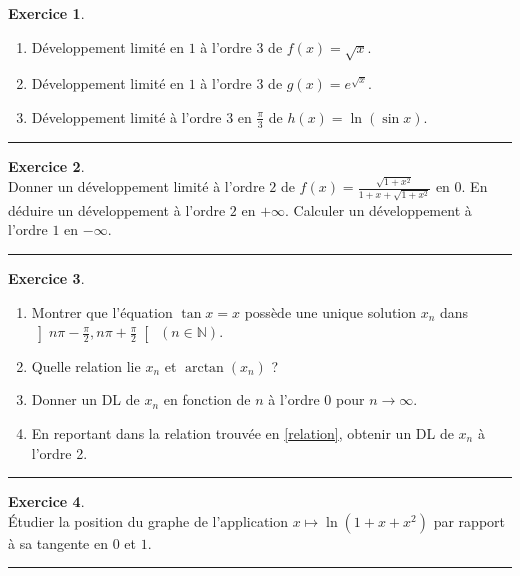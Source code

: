 \documentclass[a4paper,10pt]{article}
\theoremstyle{definition}
\theoremstyle{definition}
\newtheorem{exo}{Exercice}
\newcommand{\N}{\mathbb{N}}
\begin{document}
\begin{minipage}{1\linewidth}
\begin{minipage}[t]{0.48\linewidth}
\end{minipage}	
\hfill\vrule\hfill
\begin{minipage}[t]{0.48\linewidth}
\raggedright

\begin{exo}\quad\\
	
	\begin{enumerate}
		\item Développement limité en $1$ à l'ordre $3$ de $f(x)=\sqrt{x}$.
		
		\item Développement limité en $1$ à l'ordre $3$ de $g(x)= e^{\sqrt{x}}$.
		
		\item Développement limité à l'ordre $3$ en $\frac\pi 3$ de $h(x)=\ln (\sin x)$.
	\end{enumerate}
	\centering
	\rule{1\linewidth}{0.6pt}
\end{exo}

\begin{exo}\quad\\
	Donner un développement limité à l'ordre $2$ de $f(x)=
	\displaystyle{\frac{\sqrt{1+x^2}}{1+x+\sqrt{1+x^2}}}$ en $0$.
	En déduire un développement à l'ordre $2$ en $+\infty$.
	Calculer un développement à l'ordre $1$ en $-\infty$.
	\centering\rule{1\linewidth}{0.6pt}
\end{exo}



\begin{exo}\quad\\
\begin{enumerate}
  \item  Montrer que l'équation $\tan x = x$ possède une unique solution
   $x_n$ dans
   $\left]n\pi-\frac \pi 2, n\pi+\frac \pi 2\right[$ $(n\in \N)$.
  \item  Quelle relation lie $x_n$ et $\arctan(x_n)$ ? \label{relation}
  \item  Donner un DL de $x_n$ en fonction de $n$ à l'ordre $0$ pour $n\to\infty$.
  \item  En reportant dans la relation trouvée en \ref{relation},
     obtenir un DL de $x_n$ à l'ordre 2.
\end{enumerate}
\centering\rule{1\linewidth}{0.6pt}
\end{exo}
\begin{exo}\quad\\
\'Etudier la position du graphe de l'application $x\mapsto \ln(1+x+x^2)$ par rapport 
à sa tangente en $0$ et $1$.
	\centering\rule{1\linewidth}{0.6pt}
\end{exo}

\end{minipage}
\end{minipage}
\end{document}
